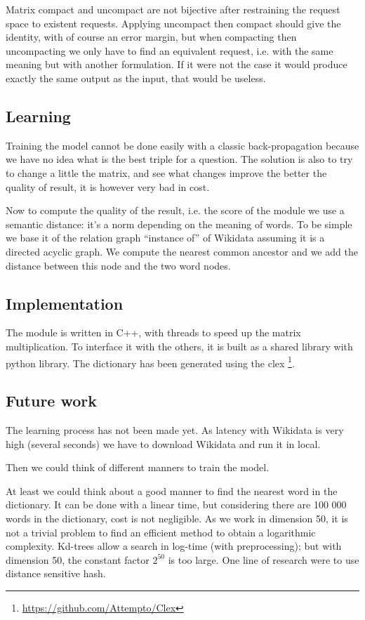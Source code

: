 Matrix compact and uncompact are not bijective after restraining the request space to existent requests. Applying uncompact then compact should give the identity, with of course an error margin, but when compacting then uncompacting we only have to find an equivalent request, i.e. with the same meaning but with another formulation. If it were not the case it would produce exactly the same output as the input, that would be useless.

\subsection{Learning}

Training the model cannot be done easily with a classic back-propagation because we have no idea what is the best triple for a question. The solution is also to try to change a little the matrix, and see what changes improve the better the quality of result, it is however very bad in cost. 

Now to compute the quality of the result, i.e. the score  of the module we use a semantic distance: it's a norm depending on the meaning of words. To be simple we base it of the relation graph ``instance of'' of Wikidata assuming it is a directed acyclic graph. We compute the nearest common ancestor and we add the distance between this node and the two word  nodes.

\subsection{Implementation}

The module is written in C++, with threads to speed up the matrix multiplication. To interface it with the others, it is built as a shared library with python library. The dictionary has been generated using the clex \footnote{\url{https://github.com/Attempto/Clex}}. 

\subsection{Future work}

The learning process has not been made yet. As latency with Wikidata is very high (several seconds) we have to download Wikidata and run it in local.

Then we could think of different manners to train the model.

At least we could think about a good manner to find the nearest word in the dictionary. It can be done with a linear time, but considering there are 100 000 words in the dictionary, cost is not negligible. As we work in dimension 50, it is not a trivial problem to find an efficient method to obtain a logarithmic complexity. Kd-trees allow a search in log-time (with preprocessing); but with dimension 50, the constant factor $2^{50}$ is too large. One line of research were to use distance sensitive hash.

